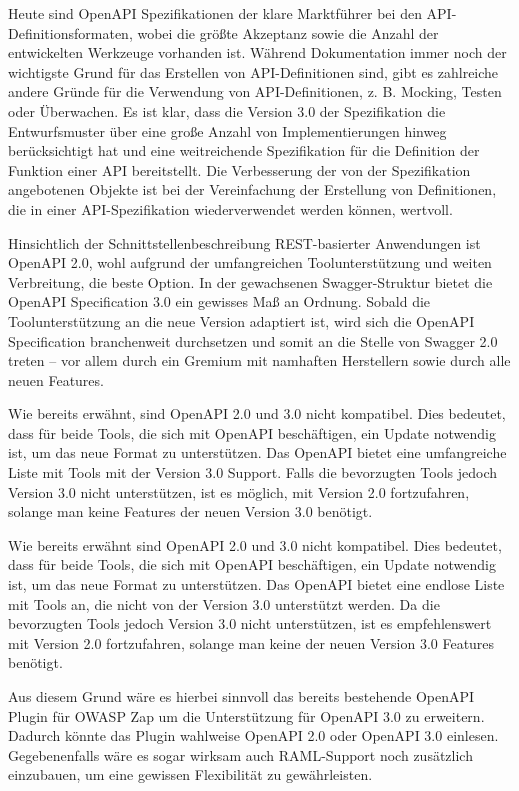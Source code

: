 Heute sind OpenAPI Spezifikationen der klare Marktführer bei den API-Definitionsformaten, wobei die größte Akzeptanz sowie die Anzahl der entwickelten Werkzeuge vorhanden ist. Während Dokumentation immer noch der wichtigste Grund für das Erstellen von API-Definitionen sind, gibt es zahlreiche andere Gründe für die Verwendung von API-Definitionen, z. B. Mocking, Testen oder Überwachen. Es ist klar, dass die Version 3.0 der Spezifikation die Entwurfsmuster über eine große Anzahl von Implementierungen hinweg berücksichtigt hat und eine weitreichende Spezifikation für die Definition der Funktion einer API bereitstellt. Die Verbesserung der von der Spezifikation angebotenen Objekte ist bei der Vereinfachung der Erstellung von Definitionen, die in einer API-Spezifikation wiederverwendet werden können, wertvoll.

Hinsichtlich der Schnittstellenbeschreibung REST-basierter Anwendungen ist OpenAPI 2.0, wohl aufgrund der umfangreichen Toolunterstützung und weiten Verbreitung, die beste Option. In der gewachsenen Swagger-Struktur bietet die OpenAPI Specification 3.0 ein gewisses Maß an Ordnung. Sobald die Toolunterstützung an die neue Version adaptiert ist, wird sich die OpenAPI Specification branchenweit durchsetzen und somit an die Stelle von Swagger 2.0 treten – vor allem durch ein Gremium mit namhaften Herstellern sowie durch alle neuen Features.

Wie bereits erwähnt, sind OpenAPI 2.0 und 3.0 nicht kompatibel. Dies bedeutet, dass für beide Tools, die sich mit OpenAPI beschäftigen, ein Update notwendig ist, um das neue Format zu unterstützen. Das OpenAPI bietet eine umfangreiche Liste mit Tools mit der Version 3.0 Support. Falls die bevorzugten Tools jedoch Version 3.0 nicht unterstützen, ist es möglich, mit Version 2.0 fortzufahren, solange man keine Features der neuen Version 3.0 benötigt.

Wie bereits erwähnt sind OpenAPI 2.0 und 3.0 nicht kompatibel. Dies bedeutet, dass für beide Tools, die sich mit OpenAPI beschäftigen, ein Update notwendig ist, um das neue Format zu unterstützen. Das OpenAPI bietet eine endlose Liste mit Tools an, die nicht von der Version 3.0 unterstützt werden. Da die bevorzugten Tools jedoch Version 3.0 nicht unterstützen, ist es empfehlenswert mit Version 2.0 fortzufahren, solange man keine der neuen Version 3.0 Features benötigt.

Aus diesem Grund wäre es hierbei sinnvoll das bereits bestehende OpenAPI Plugin für OWASP Zap um die Unterstützung für OpenAPI 3.0 zu erweitern. Dadurch könnte das Plugin wahlweise OpenAPI 2.0 oder OpenAPI 3.0 einlesen. Gegebenenfalls wäre es sogar wirksam auch RAML-Support noch zusätzlich einzubauen, um eine gewissen Flexibilität zu gewährleisten.







